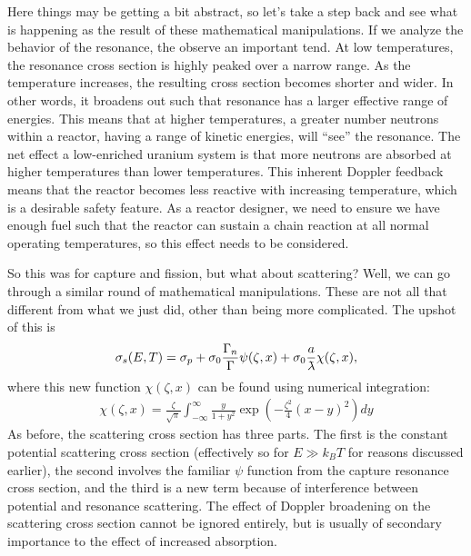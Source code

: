 Here things may be getting a bit abstract, so let's take a step back and see what is happening as the result of these mathematical manipulations. If we analyze the behavior of the resonance, the observe an important tend. At low temperatures, the resonance cross section is highly peaked over a narrow range. As the temperature increases, the resulting cross section becomes shorter and wider. In other words, it broadens out such that resonance has a larger effective range of energies. This means that at higher temperatures, a greater number neutrons within a reactor, having a range of kinetic energies, will ``see'' the resonance. The net effect a low-enriched uranium system is that more neutrons are absorbed at higher temperatures than lower temperatures. This inherent Doppler feedback means that the reactor becomes less reactive with increasing temperature, which is a desirable safety feature. As a reactor designer, we need to ensure we have enough fuel such that the reactor can sustain a chain reaction at all normal operating temperatures, so this effect needs to be considered.

So this was for capture and fission, but what about scattering? Well, we can go through a similar round of mathematical manipulations. These are not all that different from what we just did, other than being more complicated. The upshot of this is
\begin{align}
  \sigma_s(E,T) = \sigma_p + \sigma_0 \frac{\Gamma_n}{\Gamma} \psi(\zeta,x) + \sigma_0 \frac{a}{\lambdabar} \chi(\zeta,x) ,
\end{align}
where this new function $\chi(\zeta,x)$ can be found using numerical integration:
\begin{align}
  \chi(\zeta,x) = \frac{\zeta}{\sqrt{\pi}} \int_{-\infty}^\infty \frac{y}{1+y^2} \exp \left( -\frac{\zeta^2}{4} ( x - y )^2 \right) dy
\end{align}
As before, the scattering cross section has three parts. The first is the constant potential scattering cross section (effectively so for $E \gg k_B T$ for reasons discussed earlier), the second involves the familiar $\psi$ function from the capture resonance cross section, and the third is a new term because of interference between potential and resonance scattering. The effect of Doppler broadening on the scattering cross section cannot be ignored entirely, but is usually of secondary importance to the effect of increased absorption.

